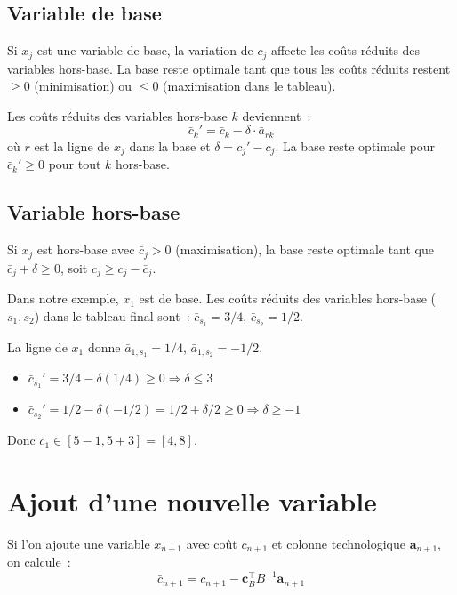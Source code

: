 \subsection{Variable de base}

Si $x_j$ est une variable de base, la variation de $c_j$ affecte les
co\^uts r\'eduits des variables hors-base.  La base reste optimale tant que
tous les co\^uts r\'eduits restent $\ge 0$ (minimisation) ou $\le 0$
(maximisation dans le tableau).

\begin{formules}[title=\textbf{Intervalle de validit\'e de $c_j$ (variable de base)}]
Les co\^uts r\'eduits des variables hors-base $k$ deviennent~:
\[
  \bar{c}_k' = \bar{c}_k - \delta \cdot \bar{a}_{rk}
\]
o\`u $r$ est la ligne de $x_j$ dans la base et $\delta = c_j' - c_j$.
La base reste optimale pour $\bar{c}_k' \ge 0$ pour tout $k$ hors-base.
\end{formules}

\subsection{Variable hors-base}

Si $x_j$ est hors-base avec $\bar{c}_j > 0$ (maximisation), la base reste
optimale tant que $\bar{c}_j + \delta \ge 0$, soit
$c_j \ge c_j - \bar{c}_j$.

\begin{exemple}[Variation de $c_1$]
Dans notre exemple, $x_1$ est de base.  Les co\^uts r\'eduits des variables
hors-base ($s_1, s_2$) dans le tableau final sont~:
$\bar{c}_{s_1} = 3/4$, $\bar{c}_{s_2} = 1/2$.

La ligne de $x_1$ donne $\bar{a}_{1,s_1} = 1/4$, $\bar{a}_{1,s_2} = -1/2$.

\begin{itemize}
  \item $\bar{c}_{s_1}' = 3/4 - \delta(1/4) \ge 0 \Rightarrow \delta \le 3$
  \item $\bar{c}_{s_2}' = 1/2 - \delta(-1/2) = 1/2 + \delta/2 \ge 0
        \Rightarrow \delta \ge -1$
\end{itemize}
Donc $c_1 \in [5-1, 5+3] = [4, 8]$.
\end{exemple}

\section{Ajout d'une nouvelle variable}

Si l'on ajoute une variable $x_{n+1}$ avec co\^ut $c_{n+1}$ et colonne
technologique $\mathbf{a}_{n+1}$, on calcule~:
\[
  \bar{c}_{n+1} = c_{n+1} - \mathbf{c}_B^\top B^{-1} \mathbf{a}_{n+1}
\]

